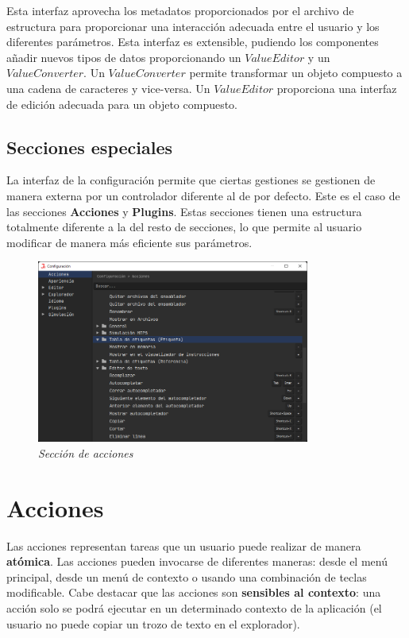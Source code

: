 \noindent Esta interfaz aprovecha los metadatos proporcionados por el archivo
de estructura para proporcionar una interacción adecuada entre el usuario
y los diferentes parámetros.
Esta interfaz es extensible, pudiendo los componentes añadir nuevos tipos de datos
proporcionando un $ValueEditor$ y un $ValueConverter$.
Un $ValueConverter$ permite transformar un objeto compuesto a una cadena
de caracteres y vice-versa.
Un $ValueEditor$ proporciona una interfaz de edición adecuada para un
objeto compuesto.

\subsection{Secciones especiales}\label{subsec:secciones-especiales}

La interfaz de la configuración permite que ciertas gestiones se
gestionen de manera externa por un controlador diferente al de
por defecto.
Este es el caso de las secciones \textbf{Acciones} y \textbf{Plugins}.
Estas secciones tienen una estructura totalmente diferente a la
del resto de secciones, lo que permite al usuario modificar
de manera más eficiente sus parámetros.

\begin{figure}[H]
    \centering
    \includegraphics[width=0.8\textwidth]{images/base/jams-config-actions}
    \caption{\textit{Sección de acciones}}
    \label{fig:jams-configuracion-acciones}
\end{figure}


\section{Acciones}\label{sec:acciones}

Las acciones representan tareas que un usuario puede realizar de manera
\textbf{atómica}.
Las acciones pueden invocarse de diferentes maneras:
desde el menú principal, desde un menú de contexto
o usando una combinación de teclas modificable.
Cabe destacar que las acciones son \textbf{sensibles al contexto}:
una acción solo se podrá ejecutar en un determinado contexto
de la aplicación (el usuario no puede copiar un trozo de texto
en el explorador).

